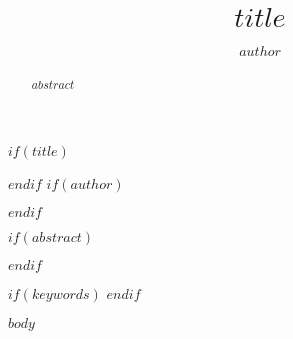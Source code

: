 \documentclass[runningheads,a4paper]{llncs}
\begin{document}
$if(title)$
\title{$title$}
$endif$
$if(author)$
\author{$author$}
$endif$




%
\iffalse
\authorinfo{
  $for(author)$$author.name$$sep$\and $endfor$
}{
$for(organization)$
  $organization.name$
$endfor$
}{
  \{$for(author)$$author.email$$sep$,$endfor$\}
}
\fi


\maketitle

$if(abstract)$
	\begin{abstract}
		$abstract$
	\end{abstract}
$endif$

$if(keywords)$
$endif$

$body$
\end{document}
